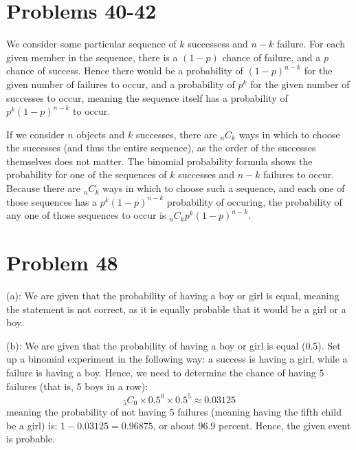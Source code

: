 \documentclass{article}
\theoremstyle{definition}
\newcommand{\?}{\stackrel{?}{=}}
\begin{document}
\section*{Problems 40-42}
We consider some particular sequence of $k$ successess and $n-k$ failure. For each given member in the sequence, there is a $(1-p)$ chance of failure, and a $p$ chance of 
success. Hence there would be a probability of $(1-p)^{n-k}$ for the given number of failures to occur, and a probability of $p^k$ for the given number of successes to occur, meaning the 
sequence itself has a probability of $p^k(1-p)^{n-k}$ to occur.


If we consider $n$ objects and $k$ successes, there are $_nC_k$ ways in which to choose the successes (and thus the entire sequence), as the order of the successes themselves does not matter.
The binomial probability formula shows the probability for one of the sequences of $k$ successes and $n-k$ failures to occur. Because there are $_nC_k$ ways in which to choose such a 
sequence, and each one of those sequences has a $p^k(1-p)^{n-k}$ probability of occuring, the probability of any one of those sequences to occur is
$_nC_kp^k(1-p)^{n-k}$.


\section*{Problem 48}
(a): We are given that the probability of having a boy or girl is equal, meaning the statement  is not 
correct, as it is equally probable that it would be a girl or a boy.


(b): We are given that the probability of having a boy or girl is equal (0.5). Set up a binomial experiment in the following way: a success is having a 
girl, while a failure is having a boy. Hence, we need to determine the chance of having $5$ failures (that is, 5 boys in a row):
\[ _5C_0\times 0.5^0\times 0.5^5\approx 0.03125 \] meaning the probability of not having $5$ failures (meaning having the fifth child be a girl) is:
$1-0.03125=0.96875$, or about $96.9$ percent. Hence, the given event is probable.
\end{document}
